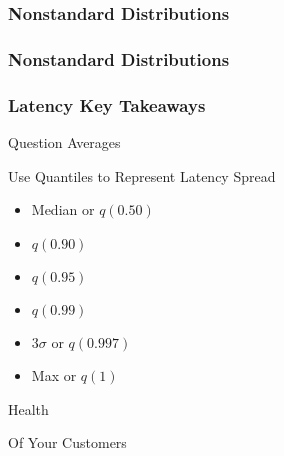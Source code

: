 \begin{frame}
    \frametitle{Nonstandard Distributions}
    \begin{figure}[!h]
        \centering
        
    \end{figure}
\end{frame}
\begin{frame}
    \frametitle{Nonstandard Distributions}
    \begin{figure}[!h]
        \centering
        
    \end{figure}
\end{frame}


\begin{frame}
    \frametitle{Latency Key Takeaways}

    Question Averages
    
    Use Quantiles to Represent Latency Spread
    \begin{itemize}
        \item Median or $q(0.50)$
        \item $q(0.90)$
        \item $q(0.95)$
        \item $q(0.99)$
        \item $3\sigma$ or $q(0.997)$
        \item Max or $q(1)$
    \end{itemize}
\end{frame}




\begin{frame}[standout]
    Health

    Of Your Customers
\end{frame}



